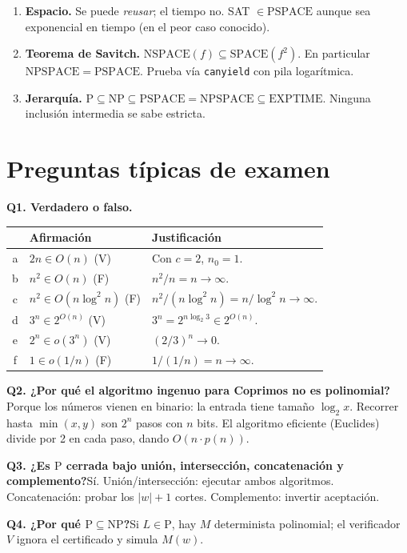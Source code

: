 \documentclass[11pt,a4paper]{article}
\theoremstyle{definicion}
\newcommand{\NP}{\mathrm{NP}}
\newcommand{\Pclass}{\mathrm{P}}
\newcommand{\SPACE}{\mathrm{SPACE}}
\newcommand{\NSPACE}{\mathrm{NSPACE}}
\newcommand{\PSPACE}{\mathrm{PSPACE}}
\newcommand{\NPSPACE}{\mathrm{NPSPACE}}
\newcommand{\EXPTIME}{\mathrm{EXPTIME}}
\begin{document}
\begin{enumerate}
    \item \textbf{Espacio.} Se puede \emph{reusar}; el tiempo no. SAT $\in \PSPACE$ aunque sea exponencial en tiempo (en el peor caso conocido).
    \item \textbf{Teorema de Savitch.} $\NSPACE(f) \subseteq \SPACE(f^2)$. En particular $\NPSPACE = \PSPACE$. Prueba v\'ia \texttt{canyield} con pila logar\'itmica.
    \item \textbf{Jerarqu\'ia.} $\Pclass \subseteq \NP \subseteq \PSPACE = \NPSPACE \subseteq \EXPTIME$. Ninguna inclusi\'on intermedia se sabe estricta.
\end{enumerate}

\section{Preguntas t\'ipicas de examen}

\textbf{Q1. Verdadero o falso.}
\begin{center}
\begin{tabular}{cll}
\toprule
 & Afirmaci\'on & Justificaci\'on \\
\midrule
a & $2n \in O(n)$ (V) & Con $c=2$, $n_0=1$. \\
b & $n^2 \in O(n)$ (F) & $n^2/n = n \to \infty$. \\
c & $n^2 \in O(n \log^2 n)$ (F) & $n^2/(n\log^2 n) = n/\log^2 n \to \infty$. \\
d & $3^n \in 2^{O(n)}$ (V) & $3^n = 2^{n \log_2 3} \in 2^{O(n)}$. \\
e & $2^n \in o(3^n)$ (V) & $(2/3)^n \to 0$. \\
f & $1 \in o(1/n)$ (F) & $1/(1/n) = n \to \infty$. \\
\bottomrule
\end{tabular}
\end{center}

\textbf{Q2. ¿Por qu\'e el algoritmo ingenuo para Coprimos no es polinomial?}\quad
Porque los n\'umeros vienen en binario: la entrada tiene tama\~no $\log_2 x$. Recorrer hasta $\min(x, y)$ son $2^n$ pasos con $n$ bits. El algoritmo eficiente (Euclides) divide por 2 en cada paso, dando $O(n \cdot p(n))$.

\textbf{Q3. ¿Es $\Pclass$ cerrada bajo uni\'on, intersecci\'on, concatenaci\'on y complemento?}\quad S\'i. Uni\'on/intersecci\'on: ejecutar ambos algoritmos. Concatenaci\'on: probar los $|w|+1$ cortes. Complemento: invertir aceptaci\'on.

\textbf{Q4. ¿Por qu\'e $\Pclass \subseteq \NP$?}\quad Si $L \in \Pclass$, hay $M$ determinista polinomial; el verificador $V$ ignora el certificado y simula $M(w)$.
\end{document}
